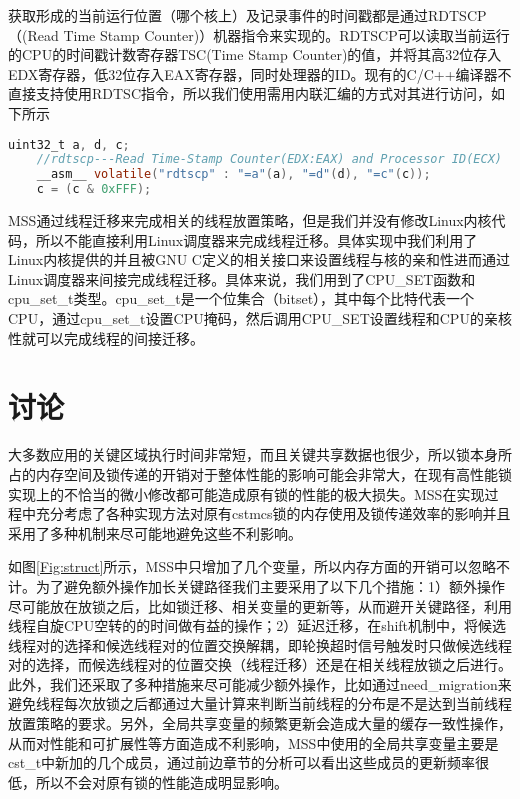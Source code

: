 获取形成的当前运行位置（哪个核上）及记录事件的时间戳都是通过RDTSCP（(Read Time Stamp Counter)）机器指令来实现的。RDTSCP可以读取当前运行的CPU的时间戳计数寄存器TSC(Time Stamp Counter)的值，并将其高32位存入EDX寄存器，低32位存入EAX寄存器，同时处理器的ID。现有的C/C++编译器不直接支持使用RDTSC指令，所以我们使用需用内联汇编的方式对其进行访问，如下所示
\begin{lstlisting}[language={C}, caption={通过内联汇编来使用RDTSCP指令}]
    uint32_t a, d, c;
    //rdtscp---Read Time-Stamp Counter(EDX:EAX) and Processor ID(ECX)
    __asm__ volatile("rdtscp" : "=a"(a), "=d"(d), "=c"(c));
    c = (c & 0xFFF);
\end{lstlisting}

MSS通过线程迁移来完成相关的线程放置策略，但是我们并没有修改Linux内核代码，所以不能直接利用Linux调度器来完成线程迁移。具体实现中我们利用了Linux内核提供的并且被GNU C定义的相关接口来设置线程与核的亲和性进而通过Linux调度器来间接完成线程迁移。具体来说，我们用到了CPU\_SET函数和cpu\_set\_t类型。cpu\_set\_t是一个位集合（bitset），其中每个比特代表一个CPU，通过cpu\_set\_t设置CPU掩码，然后调用CPU\_SET设置线程和CPU的亲核性就可以完成线程的间接迁移。

\section{讨论}
大多数应用的关键区域执行时间非常短，而且关键共享数据也很少，所以锁本身所占的内存空间及锁传递的开销对于整体性能的影响可能会非常大，在现有高性能锁实现上的不恰当的微小修改都可能造成原有锁的性能的极大损失。MSS在实现过程中充分考虑了各种实现方法对原有cstmcs锁的内存使用及锁传递效率的影响并且采用了多种机制来尽可能地避免这些不利影响。

如图\ref{Fig:struct}所示，MSS中只增加了几个变量，所以内存方面的开销可以忽略不计。为了避免额外操作加长关键路径我们主要采用了以下几个措施：1）额外操作尽可能放在放锁之后，比如锁迁移、相关变量的更新等，从而避开关键路径，利用线程自旋CPU空转的的时间做有益的操作；2）延迟迁移，在shift机制中，将候选线程对的选择和候选线程对的位置交换解耦，即轮换超时信号触发时只做候选线程对的选择，而候选线程对的位置交换（线程迁移）还是在相关线程放锁之后进行。此外，我们还采取了多种措施来尽可能减少额外操作，比如通过need\_migration来避免线程每次放锁之后都通过大量计算来判断当前线程的分布是不是达到当前线程放置策略的要求。另外，全局共享变量的频繁更新会造成大量的缓存一致性操作，从而对性能和可扩展性等方面造成不利影响，MSS中使用的全局共享变量主要是cst\_t中新加的几个成员，通过前边章节的分析可以看出这些成员的更新频率很低，所以不会对原有锁的性能造成明显影响。
